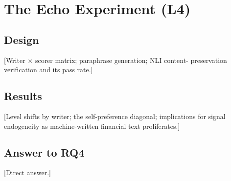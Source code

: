 %
%
\chapter{The Echo Experiment (L4)}
\label{ch:layer4}

\section{Design}
\label{sec:l4-design}

[Writer $\times$ scorer matrix; paraphrase generation; NLI content-
preservation verification and its pass rate.]

\section{Results}
\label{sec:l4-results}

[Level shifts by writer; the self-preference diagonal; implications
for signal endogeneity as machine-written financial text proliferates.]

\section{Answer to RQ4}
\label{sec:l4-answer}

[Direct answer.]

